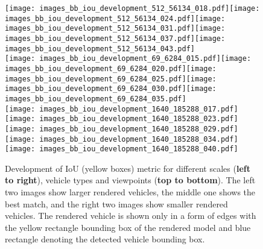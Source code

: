 \documentclass[]{elsarticle}
\begin{document}
\begin{figure*}[t]
    \centering
    \texttt{[image: images\_bb\_iou\_development\_512\_56134\_018.pdf]}\texttt{[image: images\_bb\_iou\_development\_512\_56134\_024.pdf]}\texttt{[image: images\_bb\_iou\_development\_512\_56134\_031.pdf]}\texttt{[image: images\_bb\_iou\_development\_512\_56134\_037.pdf]}\texttt{[image: images\_bb\_iou\_development\_512\_56134\_043.pdf]}\\
    \texttt{[image: images\_bb\_iou\_development\_69\_6284\_015.pdf]}\texttt{[image: images\_bb\_iou\_development\_69\_6284\_020.pdf]}\texttt{[image: images\_bb\_iou\_development\_69\_6284\_025.pdf]}\texttt{[image: images\_bb\_iou\_development\_69\_6284\_030.pdf]}\texttt{[image: images\_bb\_iou\_development\_69\_6284\_035.pdf]}\\
    \texttt{[image: images\_bb\_iou\_development\_1640\_185288\_017.pdf]}\texttt{[image: images\_bb\_iou\_development\_1640\_185288\_023.pdf]}\texttt{[image: images\_bb\_iou\_development\_1640\_185288\_029.pdf]}\texttt{[image: images\_bb\_iou\_development\_1640\_185288\_034.pdf]}\texttt{[image: images\_bb\_iou\_development\_1640\_185288\_040.pdf]}\caption{Development of IoU (yellow boxes) metric for different scales (\textbf{left to right}), vehicle types and viewpoints (\textbf{top to bottom}). The left two images show larger rendered vehicles, the middle one shows the best match, and the right two images show smaller rendered vehicles. The rendered vehicle is shown only in a form of edges with the yellow rectangle bounding box of the rendered model and blue rectangle denoting the detected vehicle bounding box.}
    \label{fig:ScaleInference}
\end{figure*}
\end{document}
